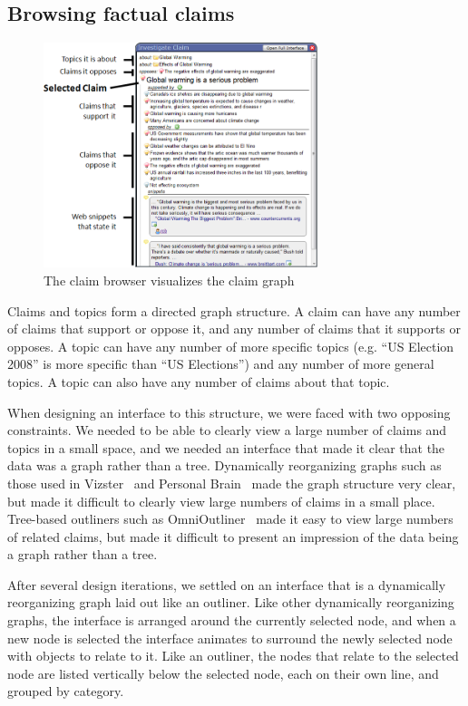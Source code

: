 \documentclass{chi2009}
\begin{document}
\subsection{Browsing factual claims}
\label{browseclaim}\label{claimbrowser}

\begin{figure}[tb]
	\begin{center}
	\includegraphics[width=8cm]{../screenshots/claimbrowse_diagram.png}
	\caption{The claim browser visualizes the claim graph}
	\label{claimbrowse_diagram}
	\end{center}
\end{figure}


Claims and topics form a directed graph structure. A claim can have any number of claims that support or oppose it, and any number of claims that it supports or opposes.
A topic can have any number of more specific topics (e.g. ``US Election 2008'' is more specific than ``US Elections'') and any number of more general topics. A topic can also have any number of claims about that topic.

When designing an interface to this structure, we were faced with two opposing constraints. We needed to be able to clearly view a large number of claims and topics in a small space, and we needed an interface that made it clear that the data was a graph rather than a tree. Dynamically reorganizing graphs such as those used in Vizster~\cite{vizster} and Personal Brain~\cite{thebrain} made the graph structure very clear, but made it difficult to clearly view large numbers of claims in a small place. Tree-based outliners such as OmniOutliner~\cite{omnioutliner} made it easy to view large numbers of related claims, but made it difficult to present an impression of the data being a graph rather than a tree.

After several design iterations, we settled on an interface that is a dynamically reorganizing graph laid out like an outliner. Like other dynamically reorganizing graphs, the interface is arranged around the currently selected node, and when a new node is selected the interface animates to surround the newly selected node with objects to relate to it. Like an outliner, the nodes that relate to the selected node are listed vertically below the selected node, each on their own line, and grouped by category.
\end{document}
